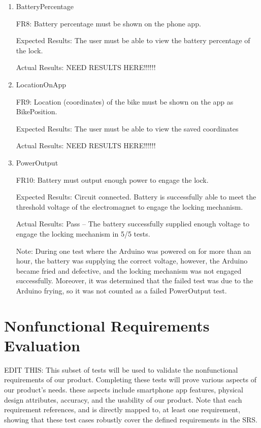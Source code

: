 \documentclass[12pt, titlepage]{article}
\begin{document}
\begin{enumerate}

\item{BatteryPercentage

FR8: Battery percentage must be shown on the phone app. }

Expected Results: The user must be able to view the battery percentage of the lock.

Actual Results: NEED RESULTS HERE!!!!!!

\item{LocationOnApp

FR9: Location (coordinates) of the bike must be shown on the app as BikePosition.}

Expected Results: The user must be able to view the saved coordinates 

Actual Results: NEED RESULTS HERE!!!!!!

\item{PowerOutput

FR10: Battery must output enough power to engage the lock. }

Expected Results: Circuit connected. Battery is successfully able to meet the threshold voltage of the electromagnet to engage the locking mechanism.  

Actual Results: Pass -- The battery successfully supplied enough voltage to engage the locking mechanism in 5/5 tests. 

Note: During one test where the Arduino was powered on for more than an hour, the battery was supplying the correct voltage, however, the Arduino became fried and defective, and the locking mechanism was not engaged successfully. Moreover, it was determined that the failed test was due to the Arduino frying, so it was not counted as a failed PowerOutput test.

\end{enumerate}

\section{Nonfunctional Requirements Evaluation}

EDIT THIS: This subset of tests will be used to validate the nonfunctional requirements of our product. Completing these tests will prove various aspects of our product's needs. these aspects include smartphone app features, physical design attributes, accuracy, and the usability of our product. Note that each requirement references, and is directly mapped to, at least one requirement, showing that these test cases robustly cover the defined requirements in the SRS.
\end{document}
